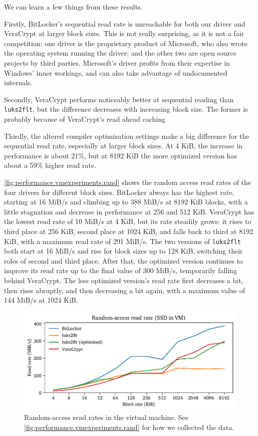 We can learn a few things from these results.

Firstly, BitLocker's sequential read rate is unreachable for both our driver and VeraCrypt at larger block sizes. This is not really surprising, as it is not a fair competition: one driver is the proprietary product of Microsoft, who also wrote the operating system running the driver; and the other two are open source projects by third parties. Microsoft's driver profits from their expertise in Windows' inner workings, and can also take advantage of undocumented internals.

Secondly, VeraCrypt performs noticeably better at sequential reading than \texttt{luks2flt}, but the difference decreases with increasing block size. The former is probably because of VeraCrypt's read ahead caching 

Thirdly, the altered compiler optimization settings make a big difference for the sequential read rate, especially at larger block sizes. At 4 KiB, the increase in performance is about 21\%, but at 8192 KiB the more optimized version has about a 59\% higher read rate.

\autoref{fig:performance.vmexperiments.rand} shows the random access read rates of the four drivers for different block sizes. BitLocker always has the highest rate, starting at 16 MiB/s and climbing up to 388 MiB/s at 8192 KiB blocks, with a little stagnation and decrease in performance at 256 and 512 KiB. VeraCrypt has the lowest read rate of 10 MiB/s at 4 KiB, but its rate steadily grows: it rises to third place at 256 KiB, second place at 1024 KiB, and falls back to third at 8192 KiB, with a maximum read rate of 291 MiB/s. The two versions of \texttt{luks2flt} both start at 16 MiB/s and rise for block sizes up to 128 KiB, switching their roles of second and third place. After that, the optimized version continues to improve its read rate up to the final value of 300 MiB/s, temporarily falling behind VeraCrypt. The less optimized version's read rate first decreases a bit, then rises abruptly, and then decreasing a bit again, with a maximum value of 144 MiB/s at 1024 KiB.

\begin{figure}[htb!]
	\center
	\includegraphics[scale=1]{../fig/performance.vmexperiments.rand.pdf}
	\caption[
		Random-access read rates in the virtual machine
	]{
		Random-access read rates in the virtual machine. See \autoref{fig:performance.vmexperiments.rand} for how we collected the data.
	}
	\label{fig:performance.vmexperiments.rand}
\end{figure}

